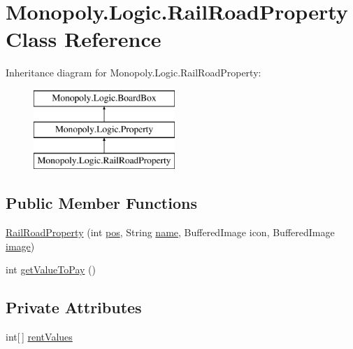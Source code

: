 \hypertarget{class_monopoly_1_1_logic_1_1_rail_road_property}{}\section{Monopoly.\+Logic.\+Rail\+Road\+Property Class Reference}
\label{class_monopoly_1_1_logic_1_1_rail_road_property}
Inheritance diagram for Monopoly.\+Logic.\+Rail\+Road\+Property\+:\begin{figure}[H]
\begin{center}
\leavevmode
\includegraphics[height=3.000000cm]{class_monopoly_1_1_logic_1_1_rail_road_property}
\end{center}
\end{figure}
\subsection*{Public Member Functions}
\begin{DoxyCompactItemize}
\item 
\hyperlink{class_monopoly_1_1_logic_1_1_rail_road_property_a7bcb4b7cf18ff4db7ffb3eece773e97e}{Rail\+Road\+Property} (int \hyperlink{class_monopoly_1_1_logic_1_1_board_box_a750c8300a134809e0eb5772b3ba92258}{pos}, String \hyperlink{class_monopoly_1_1_logic_1_1_board_box_ad5cd8d9fc191dc2df82b9fe7766210fd}{name}, Buffered\+Image icon, Buffered\+Image \hyperlink{class_monopoly_1_1_logic_1_1_board_box_a7d9f613b72c69740867388b59649d127}{image})
\item 
int \hyperlink{class_monopoly_1_1_logic_1_1_rail_road_property_a172242d8e6f78379a45b51e52cadc2c1}{get\+Value\+To\+Pay} ()
\end{DoxyCompactItemize}
\subsection*{Private Attributes}
\begin{DoxyCompactItemize}
\item 
int\mbox{[}$\,$\mbox{]} \hyperlink{class_monopoly_1_1_logic_1_1_rail_road_property_ac317b2995b89204a5ec89dabd7bcef6e}{rent\+Values}
\end{DoxyCompactItemize}
